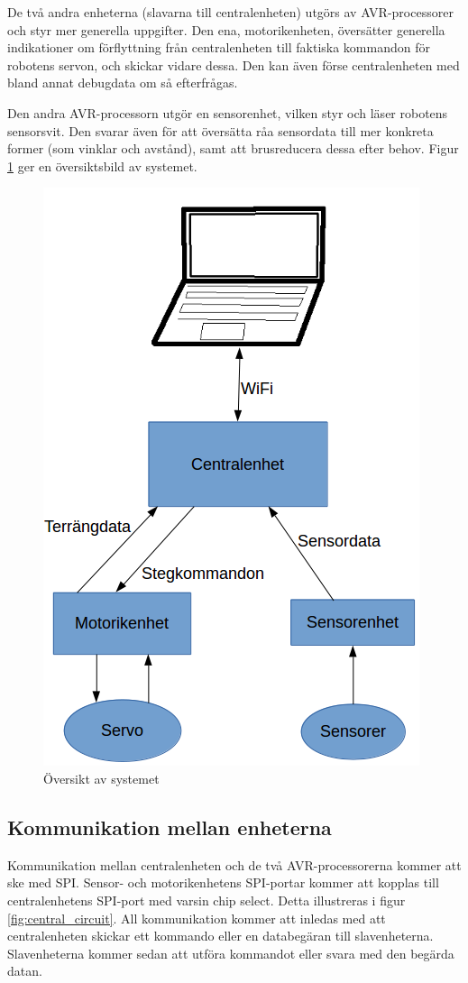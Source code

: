 \documentclass[a4paper,titlepage,12pt]{article}
\begin{document}
	De två andra enheterna (slavarna till centralenheten) utgörs av AVR-processorer och styr 
	mer generella uppgifter. Den ena, motorikenheten, översätter generella indikationer om 
	förflyttning från centralenheten till faktiska kommandon för robotens servon, och skickar 
	vidare dessa. Den kan även förse centralenheten med bland annat debugdata om så efterfrågas.
	
	Den andra AVR-processorn utgör en sensorenhet, vilken styr och läser robotens sensorsvit. 
	Den svarar även för att översätta råa sensordata till mer konkreta former (som vinklar och 
	avstånd), samt att brusreducera dessa efter behov. Figur \ref{fig:overview} ger en översiktsbild av
	systemet.
	\begin{figure}[h!]
		\centering
		\includegraphics[width=0.5\linewidth]{../images/overview.png}
		\caption{Översikt av systemet\label{fig:overview}}
	\end{figure}

	\newpage

	\subsection{Kommunikation mellan enheterna}
	Kommunikation mellan centralenheten och de två AVR-processorerna kommer att ske
	med SPI. Sensor- och motorikenhetens SPI-portar kommer att kopplas till centralenhetens
	SPI-port med varsin chip select. Detta illustreras i figur \ref{fig:central_circuit}.
	All kommunikation kommer att inledas med att 
	centralenheten skickar ett kommando eller en databegäran till slavenheterna.
	Slavenheterna kommer sedan att utföra kommandot eller svara med den begärda datan.
\end{document}
